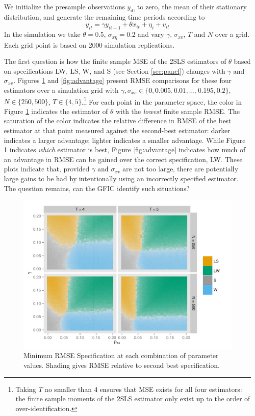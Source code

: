 We initialize the presample observations $y_{i0}$ to zero, the mean of their stationary distribution, and generate the remaining time periods according to 
$$y_{it} = \gamma y_{it-1} + \theta x_{it} + \eta_i + v_{it}$$
In the simulation we take $\theta = 0.5$, $\sigma_{x\eta}=0.2$ and vary $\gamma$, $\sigma_{xv}$, $T$ and $N$ over a grid.
Each grid point is based on 2000 simulation replications.

The first question is how the finite sample MSE of the 2SLS estimators of $\theta$ based on specifications LW, LS, W, and S (see Section \ref{sec:panel}) changes with $\gamma$ and $\sigma_{xv}$. 
Figures \ref{fig:best} and \ref{fig:advantage} present RMSE comparisons for these four estimators over a simulation grid with $\gamma, \sigma_{xv} \in \{0, 0.005, 0.01, \hdots, 0.195, 0.2\}$, $N \in \{250,500\}$, $T \in \{4,5\}$.\footnote{Taking $T$ no smaller than 4 ensures that MSE exists for all four estimators: the finite sample moments of the 2SLS estimator only exist up to the order of over-identification.} 
For each point in the parameter space, the color in Figure \ref{fig:best} indicates the estimator of $\theta$ with the \emph{lowest} finite sample RMSE. 
The saturation of the color indicates the relative difference in RMSE of the best estimator at that point measured against the second-best estimator: darker indicates a larger advantage; lighter indicates a smaller advantage. 
While Figure  \ref{fig:best} indicates \emph{which} estimator is best, Figure \ref{fig:advantage} indicates how much of an advantage in RMSE can be gained over the correct specification, LW. 
These plots indicate that, provided $\gamma$ and $\sigma_{xv}$ are not too large, there are potentially large gains to be had by intentionally using an incorrectly specified estimator. 
The question remains, can the GFIC identify such situations?

\begin{figure}
\centering
\includegraphics[scale = 0.8]{best_spec_vs_next_best}
\caption{ Minimum RMSE Specification at each combination of parameter values. Shading gives RMSE relative to second best specification.}
\label{fig:best}
\end{figure}

